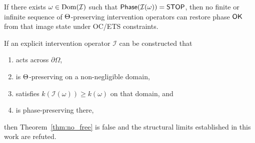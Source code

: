 \begin{theorem}
\label{thm:stop}
If there exists $\omega\in\operatorname{Dom}(\mathcal{I})$ such that
$\mathsf{Phase}(\mathcal{I}(\omega))=\mathsf{STOP}$, then no finite or infinite sequence of
$\Theta$-preserving intervention operators can restore phase $\mathsf{OK}$ from that
image state under OC/ETS constraints.
\end{theorem}

\begin{corollary}
\label{cor:fals}
If an explicit intervention operator $\mathcal{I}$ can be constructed that
\begin{enumerate}
\item acts across $\partial\Omega$,
\item is $\Theta$-preserving on a non-negligible domain,
\item satisfies $k(\mathcal{I}(\omega))\ge k(\omega)$ on that domain, and
\item is phase-preserving there,
\end{enumerate}
then Theorem~\ref{thm:no_free} is false and the structural limits established in
this work are refuted.
\end{corollary}

